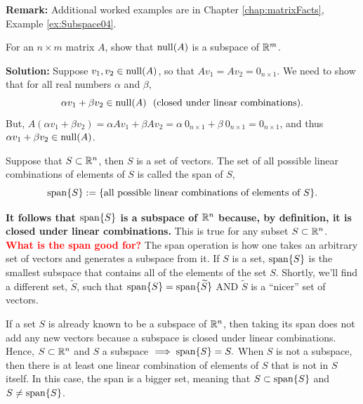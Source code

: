 \textbf{Remark:} Additional worked examples are in Chapter \ref{chap:matrixFacts}, Example \ref{ex:Subspace04}.

\vspace*{.2cm}

\begin{example}
\label{ex:NullSpaceIsSubSpace} 
For an $n \times m$ matrix $A$, show that $\mathrm{null}(A)$ is a subspace of $\mathbb R^m$.
 \end{example}

\textbf{Solution:} Suppose $v_1, v_2 \in \mathrm{null}(A)$, so that $A v_1 = A v_2 =  0_{n \times 1}$. We need to show that for all real numbers $\alpha$ and $\beta$, 
\begin{equation}
    \alpha v_1 + \beta v_2  \in \mathrm{null}(A)~~\text{(closed under linear combinations)}.
\end{equation}
But, $A \left(   \alpha v_1 + \beta v_2 \right) =  \alpha  A v_1 + \beta A v_2 = \alpha ~0_{n \times 1} + \beta ~0_{n \times 1} = 0_{n \times 1}$, and thus 
$ \alpha v_1 + \beta v_2 \in \mathrm{null}(A)$.
\Qed


\vspace*{.2cm}

\begin{tcolorbox}[sharp corners, colback=green!30, colframe=green!80!blue, title=\textbf{\Large Span of a Set of Vectors}]
Suppose that $S \subset \mathbb R^n$, then $S$ is a set of vectors. The set of all possible linear combinations of elements of $S$ is called the span of $S$,
$$\mathrm{span} \{ S \}:=\{ \text{all possible linear combinations of elements of}~S \}. $$

\textbf{It follows that $\mathrm{span} \{ S \}$ is a subspace of $\mathbb R^n$ because, by definition, it is closed under linear combinations.} This is true for any subset $S \subset \mathbb R^n$.\\

\textcolor{red}{\bf What is the span good for?} The span operation is how one takes an arbitrary set of vectors and generates a subspace from it. If $S$ is a set, $\mathrm{span} \{ S \}$ is the smallest subspace that contains all of the elements of the set $S$. Shortly, we'll find a different set, $\widetilde S$, such that $\mathrm{span} \{ S \}=\mathrm{span} \{ \widetilde S \}$ AND $\widetilde S$ is a ``nicer'' set of vectors.
\end{tcolorbox}

\vspace*{.2cm}

If a set $S$ is already known to be a subspace of $\mathbb R^n$, then taking its span does not add any new vectors because a subspace is closed under linear combinations. Hence, $S \subset \mathbb R^n$ and $S$ a subspace $\implies \mathrm{span} \{ S \}=S.$ When $S$ is not a subspace, then there is at least one linear combination of elements of $S$ that is not in $S$ itself. In this case, the span is a bigger set, meaning that $S\subset \mathrm{span} \{ S \}$ and $S \neq \mathrm{span} \{ S \}$. \\

